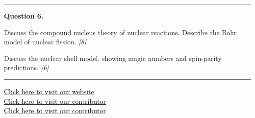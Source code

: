 \documentclass[11pt,a4paper]{article}
\newcommand{\pts}[1]{\hfill   \textit{[#1]}}
\begin{document}
\medskip\rule{\linewidth}{0.2pt}




\noindent   \textbf{Question 6.}

\begin{parts}
  \item Discuss the compound nucleus theory of nuclear reactions. Describe the Bohr model of nuclear fission. \pts{8}
  \item Discuss the nuclear shell model, showing magic numbers and spin-parity predictions. \pts{6}
\end{parts}

\vfill
\rule{\linewidth}{0.4pt}

\begin{center}\small
  \href{https://bhu-exam.vercel.app/}{Click here to visit our website}\\[4pt]
  \href{https://me-aryan.vercel.app/}{Click here to visit our contributor}\\[4pt]
  \href{https://quashan-me.vercel.app/}{Click here to visit our contributor}
\end{center}
\end{document}
